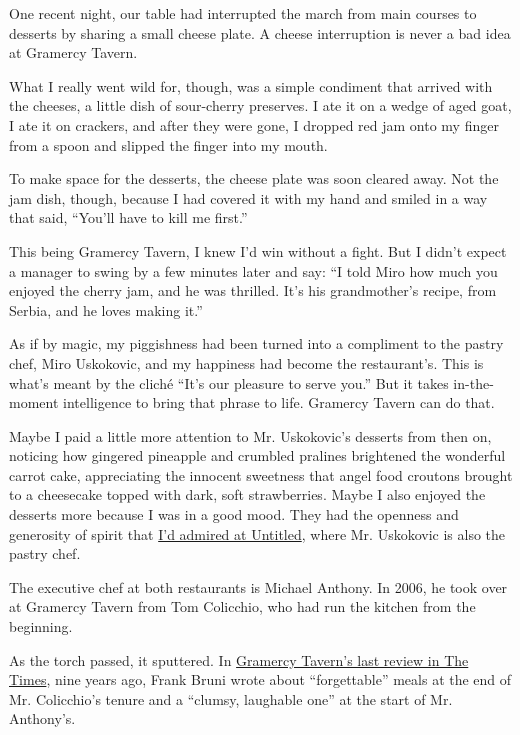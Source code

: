 One recent night, our table had interrupted the march from main courses
to desserts by sharing a small cheese plate. A cheese interruption is
never a bad idea at Gramercy Tavern.

What I really went wild for, though, was a simple condiment that arrived
with the cheeses, a little dish of sour-cherry preserves. I ate it on a
wedge of aged goat, I ate it on crackers, and after they were gone, I
dropped red jam onto my finger from a spoon and slipped the finger into
my mouth.

To make space for the desserts, the cheese plate was soon cleared away.
Not the jam dish, though, because I had covered it with my hand and
smiled in a way that said, ``You'll have to kill me first.''

This being Gramercy Tavern, I knew I'd win without a fight. But I didn't
expect a manager to swing by a few minutes later and say: ``I told Miro
how much you enjoyed the cherry jam, and he was thrilled. It's his
grandmother's recipe, from Serbia, and he loves making it.''

As if by magic, my piggishness had been turned into a compliment to the
pastry chef, Miro Uskokovic, and my happiness had become the
restaurant's. This is what's meant by the cliché ``It's our pleasure to
serve you.'' But it takes in-the-moment intelligence to bring that
phrase to life. Gramercy Tavern can do that.

Maybe I paid a little more attention to Mr. Uskokovic's desserts from
then on, noticing how gingered pineapple and crumbled pralines
brightened the wonderful carrot cake, appreciating the innocent
sweetness that angel food croutons brought to a cheesecake topped with
dark, soft strawberries. Maybe I also enjoyed the desserts more because
I was in a good mood. They had the openness and generosity of spirit
that
\href{https://www.nytimes3xbfgragh.onion/2015/08/05/dining/restaurant-review-untitled-at-the-whitney-in-the-meatpacking-district.html}{I'd
admired at Untitled}, where Mr. Uskokovic is also the pastry chef.

The executive chef at both restaurants is Michael Anthony. In 2006, he
took over at Gramercy Tavern from Tom Colicchio, who had run the kitchen
from the beginning.

As the torch passed, it sputtered. In
\href{http://www.nytimes3xbfgragh.onion/2007/06/06/dining/reviews/06rest.html}{Gramercy
Tavern's last review in The Times}, nine years ago, Frank Bruni wrote
about ``forgettable'' meals at the end of Mr. Colicchio's tenure and a
``clumsy, laughable one'' at the start of Mr. Anthony's.

